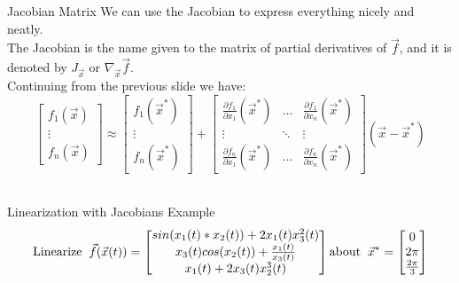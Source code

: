 \documentclass{beamer}
\begin{document}
	\begin{frame}{Jacobian Matrix}
	We can use the Jacobian to express everything nicely and neatly. \\
	The Jacobian is the name given to the matrix of partial derivatives of $\vec{f}$, and it is denoted by $J_{\vec{x}}$ or $\nabla_{\vec{x}}\vec{f}$. \\ \pause
	Continuing from the previous slide we have: \\
	\[
	\begin{bmatrix} f_1(\vec{x}) \\ \vdots \\f_n(\vec{x}) \end{bmatrix} \approx 
	\begin{bmatrix} f_1(\vec{x}^*) \\ \vdots \\f_n(\vec{x}^*) \end{bmatrix} + 
	\begin{bmatrix} \frac{\partial f_1}{\partial x_1}(\vec{x}^*)& \hdots& \frac{\partial f_1}{\partial x_n}(\vec{x}^*) \\ \vdots & \ddots &\vdots \\ \frac{\partial f_n}{\partial x_1}(\vec{x}^*)& \hdots &  \frac{\partial f_n}{\partial x_n}(\vec{x}^*) \end{bmatrix}
	(\vec{x} - \vec{x}^*)
	\]
	\\

	\end{frame}

	\begin{frame}{Linearization with Jacobians Example}
	    \begin{align*}
	    \text{Linearize}  \hspace{0.2 cm} 
	     \vec{f}(\vec{x}(t))  = 
	    \begin{bmatrix}
	    sin(x_1(t)*x_2(t)) + 2x_1(t)x_3^2(t)\\
	    x_3(t)cos(x_2(t)) + \frac{x_1(t)}{x_3(t)}\\
	    x_1(t) + 2x_3(t)x_2^3(t)
	    \end{bmatrix} 
	    \text{about} \hspace{0.2 cm} \vec{x}^* = \begin{bmatrix}
	    0\\ 2 \pi \\ \frac{2 \pi}{3}
	    \end{bmatrix} 
	    \end{align*}
	\end{frame}
\end{document}
